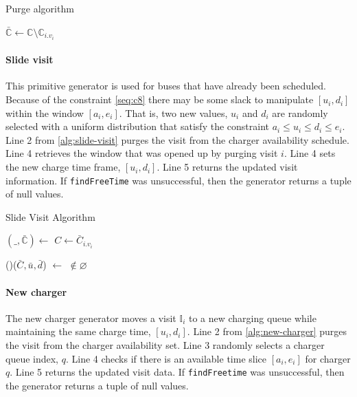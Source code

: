\documentclass[11pt,a4paper,final]{article}
\newcommand{\I}{\mathbb{I}}                 %
\newcommand{\C}{\mathbb{C}}                 %
\newcommand{\Sol}{\mathbb{S}}               %
\begin{document}
\begin{algorithm}[H]
  \caption{Purge algorithm} \label{alg:purge}
    \LinesNumbered
    \KwIn{$\Sol$}
    \KwOut{$\bar{\Sol}$}

    \Begin
    {
        $\bar{\C} \leftarrow \C \setminus \C_{i.v_i}$
        \Return{$(\_, \bar{\C})$}
    }
  \end{algorithm}

\paragraph{Slide visit}
\label{slide-visit}
This primitive generator is used for buses that have already been scheduled. Because of the constraint \ref{seq:c8}
there may be some slack to manipulate \([u_i, d_i]\) within the window \([a_i, e_i]\). That is, two new values, \(u_i\) and
\(d_i\) are randomly selected with a uniform distribution that satisfy the constraint \(a_i \leq u_i \leq d_i \leq e_i\). Line 2 from
\ref{alg:slide-visit} purges the visit from the charger availability schedule. Line 4 retrieves the window that was
opened up by purging visit \(i\). Line 4 sets the new charge time frame, \([u_i, d_i]\). Line 5 returns the updated visit
information. If \texttt{findFreeTime} was unsuccessful, then the generator returns a tuple of null values.

\begin{algorithm}[H]
  \caption{Slide Visit Algorithm} \label{alg:slide-visit}
  \LinesNumbered
  \KwIn{$\Sol$}
  \KwOut{$\bar{\Sol}$}


    \Begin
    {
      $(\_, \bar{\C}) \leftarrow$\Purge{$\Sol$}
      $C \leftarrow \bar{C}_{i.v_i}$

        \If(){($\bar{C}, \bar{u}, \bar{d}$) $\leftarrow$ \findFreeTime{$C$, $\I_{i.a}, \I_{i.e}$} $\not\in \varnothing$}
        {
          \Return{($\_, (\I_{i.v_i},\bar{u},\bar{d}),\bar{C}$)}
        }

        \Return{($\varnothing$)}
    }
  \end{algorithm}

\paragraph{New charger}
\label{new-charger}
The new charger generator moves a visit \(\I_i\) to a new charging queue while maintaining the same charge time, \([u_i,
d_i]\). Line 2 from \ref{alg:new-charger} purges the visit from the charger availability set. Line 3 randomly selects a
charger queue index, \(q\). Line 4 checks if there is an available time slice \([a_i, e_i]\) for charger \(q\). Line 5 returns
the updated visit data. If \texttt{findFreetime} was unsuccessful, then the generator returns a tuple of null values.
\end{document}
